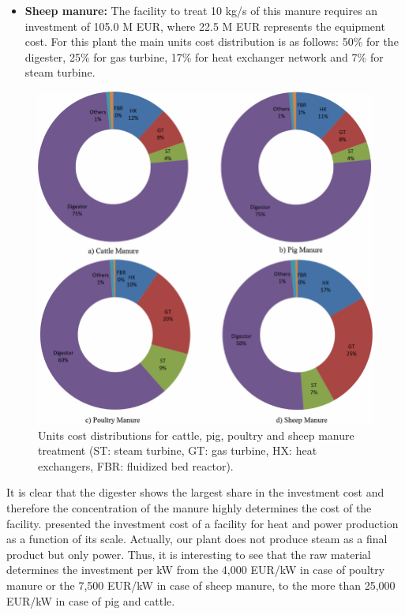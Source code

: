 \begin{refsection}[referencesCh2]
\begin{itemize}
	\item \textbf{Sheep manure:} The facility to treat 10 kg/s of this manure requires an investment of 105.0 M EUR, where 22.5 M EUR represents the equipment cost. For this plant the main units cost distribution is as follows: 50\% for the digester, 25\% for gas turbine, 17\% for heat exchanger network and 7\% for steam turbine.
\end{itemize}

\begin{figure}[h]
	\centering
	\includegraphics[width=0.8\linewidth, trim={0cm 0cm 0cm 0cm},clip]{gfx/Chapter2/Fig7.pdf} 
	\caption{Units cost distributions for cattle, pig, poultry and sheep manure treatment (ST: steam turbine, GT: gas turbine, HX: heat exchangers, FBR: fluidized bed reactor).}
	\label{fig:CostDist}
\end{figure}

It is clear that the digester shows the largest share in the investment cost and therefore the concentration of the manure highly determines the cost of the facility. \citet{lantz2012economic} presented the investment cost of a facility for heat and power production as a function of its scale. Actually, our plant does not produce steam as a final product but only power. Thus, it is interesting to see that the raw material determines the investment per kW from the 4,000 EUR/kW in case of poultry manure or the 7,500 EUR/kW in case of sheep manure, to the more than 25,000 EUR/kW in case of pig and cattle.


\end{refsection}
